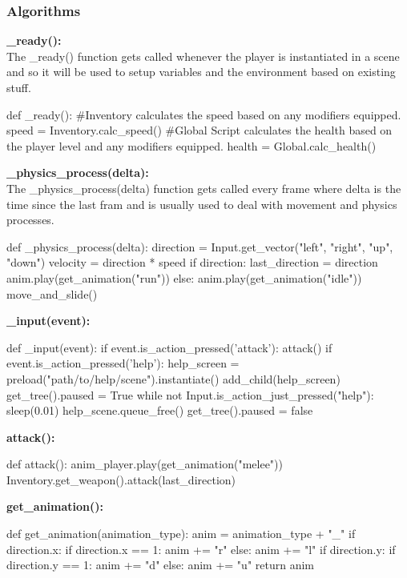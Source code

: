 \documentclass{article}
\begin{document}
        \subsubsection{Algorithms}
        \textbf{\_ready():}\\
        The \_ready() function gets called whenever the player is instantiated in a scene and so it will be used to setup variables and the environment based on existing stuff.\\
        \begin{python}
def _ready():
        #Inventory calculates the speed based on any modifiers equipped.
        speed = Inventory.calc_speed() 
        #Global Script calculates the health based on the player level and any modifiers equipped.
        health = Global.calc_health()
        \end{python}
        \textbf{\_physics\_process(delta):}\\
        The \_physics\_process(delta) function gets called every frame where delta is the time since the last fram and is usually used to deal with movement and physics processes.\\
        \begin{python}
def _physics_process(delta):
   direction = Input.get_vector("left", "right", "up", "down")
   velocity = direction * speed
   if direction:
      last_direction = direction
      anim.play(get_animation("run"))
   else:
      anim.play(get_animation("idle"))
   move_and_slide()
        \end{python}
        \textbf{\_input(event):}\\
        \begin{python}
def _input(event):
   if event.is_action_pressed('attack'):
      attack()
   if event.is_action_pressed('help'):
      help_screen = preload("path/to/help/scene").instantiate()
      add_child(help_screen)
      get_tree().paused = True
      while not Input.is_action_just_pressed("help"):
         sleep(0.01)
      help_scene.queue_free()
      get_tree().paused = false
        \end{python}
        \textbf{attack():}
        \begin{python}
def attack():
   anim_player.play(get_animation("melee"))
   Inventory.get_weapon().attack(last_direction)
        \end{python}
        \textbf{get\_animation():}
        \begin{python}
def get_animation(animation_type):
   anim = animation_type + "_"
   if direction.x:
      if direction.x == 1:
         anim += "r"
      else:
         anim += "l"
   if direction.y:
      if direction.y == 1:
         anim += "d"
      else:
         anim += "u"
   return anim
        \end{python}
\end{document}
